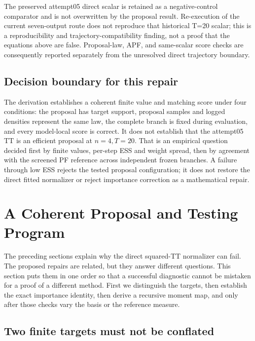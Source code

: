\documentclass[11pt]{article}
\begin{document}
The preserved attempt05 direct scalar is retained as a negative-control
comparator and is not overwritten by the proposal result.  Re-execution of the
current seven-output route does not reproduce that historical T=20 scalar;
this is a reproducibility and trajectory-compatibility finding, not a proof
that the equations above are false.  Proposal-law, APF, and same-scalar score
checks are consequently reported separately from the unresolved direct
trajectory boundary.

\subsection{Decision boundary for this repair}

The derivation establishes a coherent finite value and matching score under
four conditions: the proposal has target support, proposal samples and logged
densities represent the same law, the complete branch is fixed during
evaluation, and every model-local score is correct. It does not establish that
the attempt05 TT is an efficient proposal at $n=4,T=20$. That is an empirical
question decided first by finite values, per-step ESS and weight spread, then
by agreement with the screened PF reference across independent frozen
branches. A failure through low ESS rejects the tested proposal configuration;
it does not restore the direct fitted normalizer or reject importance
correction as a mathematical repair.

\section{A Coherent Proposal and Testing Program}
\label{sec:coherent-program}

The preceding sections explain why the direct squared-TT normalizer can fail.
The proposed repairs are related, but they answer different questions. This
section puts them in one order so that a successful diagnostic cannot be
mistaken for a proof of a different method. First we distinguish the targets,
then establish the exact importance identity, then derive a recursive moment
map, and only after those checks vary the basis or the reference measure.

\subsection{Two finite targets must not be conflated}
\end{document}
